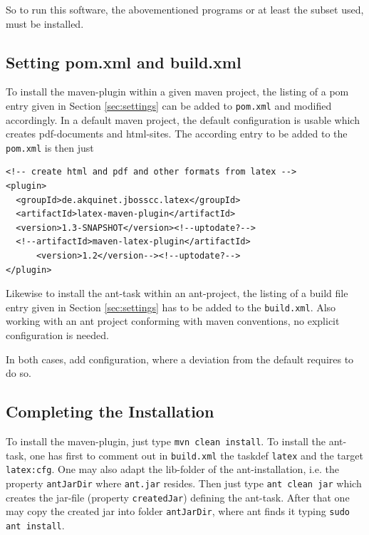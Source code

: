 \documentclass[12pt]{article}
\begin{document}
So to run this software, the abovementioned programs 
or at least the subset used, must be installed. 

\subsection{Setting pom.xml and build.xml}\label{subsec:sgml}

To install the maven-plugin within a given maven project, 
the listing of a pom entry given in Section \ref{sec:settings} 
can be added to {\tt pom.xml} and modified accordingly. 
In a default maven project, 
the default configuration is usable which creates pdf-documents and
\gls{html}-sites. 
The according entry to be added to the {\tt pom.xml} is then just 
%
\lstset{language=xml, basicstyle=\small}
\begin{lstlisting}
<!-- create html and pdf and other formats from latex -->
<plugin>
  <groupId>de.akquinet.jbosscc.latex</groupId>
  <artifactId>latex-maven-plugin</artifactId>
  <version>1.3-SNAPSHOT</version><!--uptodate?-->
  <!--artifactId>maven-latex-plugin</artifactId>
      <version>1.2</version--><!--uptodate?-->
</plugin>
\end{lstlisting}

Likewise to install the ant-task within an ant-project, 
the listing of a build file entry given in Section \ref{sec:settings} 
has to be added to the {\tt build.xml}. 
Also working with an ant project 
conforming with maven conventions, 
no explicit configuration is needed. 

In both cases, add configuration, 
where a deviation from the default requires to do so. 



\subsection{Completing the Installation}\label{subsec:instComplete}

To install the maven-plugin, just type {\tt mvn clean install}. 
To install the ant-task, one has first to comment out in {\tt build.xml} 
the taskdef {\tt latex} and the target {\tt latex:cfg}. 
One may also adapt the lib-folder of the ant-installation, 
i.e. the property {\tt antJarDir} where {\tt ant.jar} resides. 
Then just type {\tt ant clean jar} 
which creates the jar-file (property {\tt createdJar}) defining the ant-task. 
After that one may copy the created jar into folder {\tt antJarDir}, 
where ant finds it typing {\tt sudo ant install}. 
\end{document}

